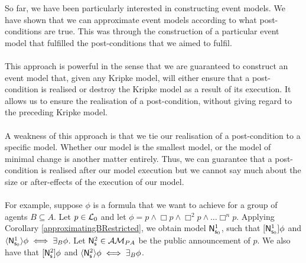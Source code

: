 So far, we have been particularly interested in constructing event models.
We have shown that we can approximate event models according to what
post-conditions are true.
This was through the construction of a particular event model that fulfilled
the post-conditions that we aimed to fulfil.\\
\\
This approach is powerful in the sense that we are guaranteed to construct an event model
that, given any Kripke model, will either ensure that a post-condition
is realised or destroy the Kripke model as a result of its execution.
It allows us to ensure the realisation of a post-condition, without giving
regard to the preceding Kripke model.\\
\\
A weakness of this approach is that we tie our realisation of a post-condition to a specific model.
Whether our model is the smallest model, or the model of minimal change is another matter entirely.
Thus, we can guarantee that a post-condition is realised after our model
execution but we cannot say much about the size or after-effects of the
execution of our model.\\
\\
For example, suppose $\phi$ is a formula that we want to achieve for a group of agents $B \subseteq
A$.
Let $p \in \mathcal{L}_0$ and let $\phi = p \land \Box p \land \Box^2 p \land \ldots \Box^n p$.
Applying Corollary \ref{approximatingBRestricted}, we obtain model $\mathrm{\mathsf{N}}^1_{\mathrm{\mathsf{s}}_0}$, such that
$[{\mathrm{\mathsf{N}}^1_{\mathrm{\mathsf{s}}_0}}]\phi$
and $\langle { \ensuremath {\mathrm{\mathsf{N}}} ^1_{ \ensuremath {\mathrm{\mathsf{s}}} _0}} \rangle\phi \iff \exists_B \phi$.
Let $\mathrm{\mathsf{N}}^2_\mathrm{\mathsf{s}} \in \mathcal{AM}_{PA}$ be the public announcement of $p$.
We also have that $[{\mathrm{\mathsf{N}}^2_\mathrm{\mathsf{s}}}] \phi$ and $\langle { \ensuremath {\mathrm{\mathsf{N}}} ^2_ \ensuremath {\mathrm{\mathsf{s}}} } \rangle \phi \iff \exists_B \phi$.

